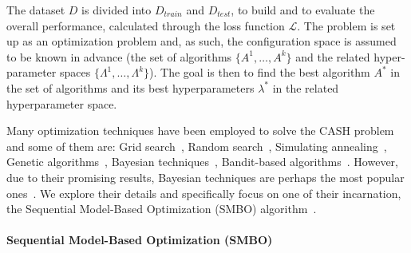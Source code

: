 The dataset $D$ is divided into $D_{train}$ and $D_{test}$, to build and to evaluate the overall performance, calculated through the loss function $\mathcal{L}$. The problem is set up as an optimization problem and, as such, the configuration space is assumed to be known in advance (the set of algorithms $\{A^{1}, \dots , A^{k}\}$ and the related hyper-parameter spaces $\{\Lambda^{1}, \dots, \Lambda^{k}\}$).
The goal is then to find the best algorithm $A^{\ast}$ in the set of algorithms and its best hyperparameters $\lambda^{\ast}$ in the related hyperparameter space. 

Many optimization techniques have been employed to solve the CASH problem and some of them are: Grid search\textcolor{red}{~\cite{montgomery2017design}}, Random search\textcolor{red}{~\cite{bergstra2012random}}, Simulating annealing\textcolor{red}{~\cite{van1987simulated}}, Genetic algorithms\textcolor{red}{~\cite{kramer2017genetic}}, Bayesian techniques\textcolor{red}{~\cite{gp_kernel}}, Bandit-based algorithms~\textcolor{red}{\cite{li2017hyperband}}.
However, due to their promising results, Bayesian techniques are perhaps the most popular ones~\cite{zoller2019survey,autoMLsurveyQuanming}. We explore their details and specifically focus on one of their incarnation, the Sequential Model-Based Optimization (SMBO) algorithm~\cite{hutter2011sequential}.

\paragraph{Sequential Model-Based Optimization (SMBO)}

